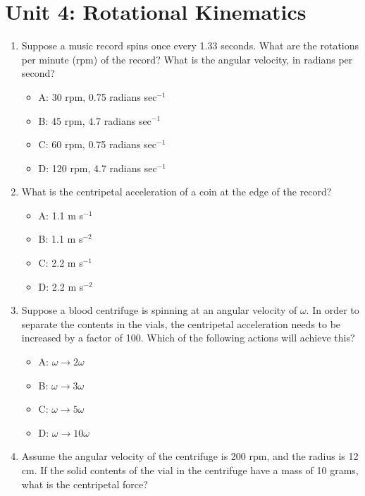 \documentclass[10pt]{article}
\begin{document}
\twocolumn

\maketitle

\section{Unit 4: Rotational Kinematics}

\begin{enumerate}
\item Suppose a music record spins once every 1.33 seconds.  What are the rotations per minute (rpm) of the record?  What is the angular velocity, in radians per second?
\begin{itemize}
\item A: 30 rpm, 0.75 radians sec$^{-1}$
\item B: 45 rpm, 4.7 radians sec$^{-1}$
\item C: 60 rpm, 0.75 radians sec$^{-1}$
\item D: 120 rpm, 4.7 radians sec$^{-1}$
\end{itemize}
\item What is the centripetal acceleration of a coin at the edge of the record?
\begin{itemize}
\item A: 1.1 m s$^{-1}$
\item B: 1.1 m s$^{-2}$
\item C: 2.2 m s$^{-1}$
\item D: 2.2 m s$^{-2}$
\end{itemize}
\item Suppose a blood centrifuge is spinning at an angular velocity of $\omega$. In order to separate the contents in the vials, the centripetal acceleration needs to be increased by a factor of 100.  Which of the following actions will achieve this?
\begin{itemize}
\item A: $\omega \rightarrow 2\omega$
\item B: $\omega \rightarrow 3\omega$
\item C: $\omega \rightarrow 5\omega$
\item D: $\omega \rightarrow 10\omega$
\end{itemize}
\item Assume the angular velocity of the centrifuge is 200 rpm, and the radius is 12 cm.  If the solid contents of the vial in the centrifuge have a mass of 10 grams, what is the centripetal force?

\end{enumerate}
\end{document}
